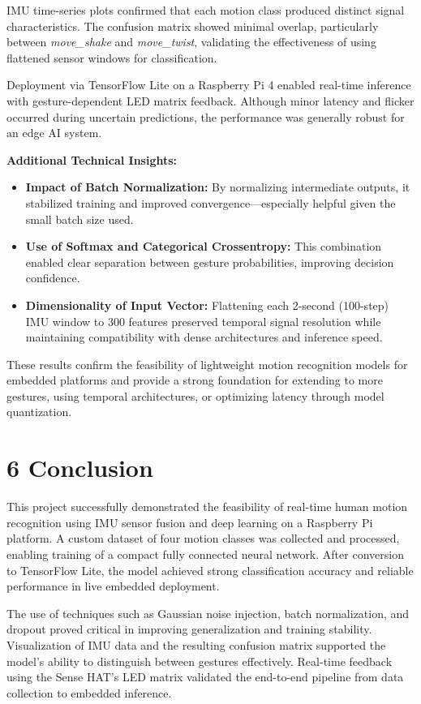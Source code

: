 \documentclass[a4paper,12pt]{article}
\begin{document}
IMU time-series plots confirmed that each motion class produced distinct signal characteristics. The confusion matrix showed minimal overlap, particularly between \textit{move\_shake} and \textit{move\_twist}, validating the effectiveness of using flattened sensor windows for classification.

Deployment via TensorFlow Lite on a Raspberry Pi 4 enabled real-time inference with gesture-dependent LED matrix feedback. Although minor latency and flicker occurred during uncertain predictions, the performance was generally robust for an edge AI system.

\textbf{Additional Technical Insights:}
\begin{itemize}
    \item \textbf{Impact of Batch Normalization:} By normalizing intermediate outputs, it stabilized training and improved convergence—especially helpful given the small batch size used.
    \item \textbf{Use of Softmax and Categorical Crossentropy:} This combination enabled clear separation between gesture probabilities, improving decision confidence.
    \item \textbf{Dimensionality of Input Vector:} Flattening each 2-second (100-step) IMU window to 300 features preserved temporal signal resolution while maintaining compatibility with dense architectures and inference speed.
\end{itemize}

These results confirm the feasibility of lightweight motion recognition models for embedded platforms and provide a strong foundation for extending to more gestures, using temporal architectures, or optimizing latency through model quantization.

\section*{6 Conclusion}

This project successfully demonstrated the feasibility of real-time human motion recognition using IMU sensor fusion and deep learning on a Raspberry Pi platform. A custom dataset of four motion classes was collected and processed, enabling training of a compact fully connected neural network. After conversion to TensorFlow Lite, the model achieved strong classification accuracy and reliable performance in live embedded deployment.

The use of techniques such as Gaussian noise injection, batch normalization, and dropout proved critical in improving generalization and training stability. Visualization of IMU data and the resulting confusion matrix supported the model's ability to distinguish between gestures effectively. Real-time feedback using the Sense HAT’s LED matrix validated the end-to-end pipeline from data collection to embedded inference.
\end{document}
